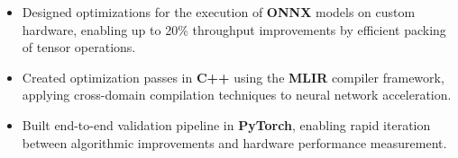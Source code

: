 \documentclass{moderncv}
\begin{document}
\begin{comment}
\cventry{Sep 2022 - Dec 2022}{SQL Compiler Engineer (Co-op)}{Snowflake}{San Mateo CA}{}
{\begin{itemize}
    \item Developed data privacy features at the \textbf{SQL} query engine level for Snowflake's cloud database platform.
    \item Added rules to an \textbf{ANTLR 3} grammar to enable managing data aggregation policies in \textbf{SQL}, enabling customers to share data while maintaining their users' privacy.
    \item Implemented compiler changes in \textbf{Java} to parse and generate code for applying policies to a table.
    \item Implemented changes to a custom \textbf{FoundationDB} layer to store information about policies.
\end{itemize}}
\end{comment}

\begin{comment}
Snowflake1: Aggregation Policy Parser Stuff
basically, added a new type of policy which is an SQL object
it had to be added to the parser through an ANTLR grammar
but there was an issue with the way the grammar was factored into sub-grammars
so I had to inspect generated code and eventually refactor the root rules
into subrules in separate files
    rootparser.g:
        rule -> rule1 | rule2 | rule3;
    rules1.g:
        rule1 -> [...]
        rule2 -> [...]
    rules2.g:
        rule3 -> [...]
became
    rootparser.g:
        rule -> rules1 | rules2
    rules1.g:
        rules1 -> rule1 | rule2
        rule1 -> [...]
        rule2 -> [...]
    rules2.g:
        rule3 -> [...]
and then i was able to implement the rules for that type of policy
\end{comment}

{\begin{itemize}
    \item Designed optimizations for the execution of \textbf{ONNX} models on custom hardware, enabling up to 20\% throughput improvements by efficient packing of tensor operations.
    \item Created optimization passes in \textbf{C++} using the \textbf{MLIR} compiler framework, applying cross-domain compilation techniques to neural network acceleration.
    \item Built end-to-end validation pipeline in \textbf{PyTorch}, enabling rapid iteration between algorithmic improvements and hardware performance measurement.
\end{itemize}}
\end{document}
